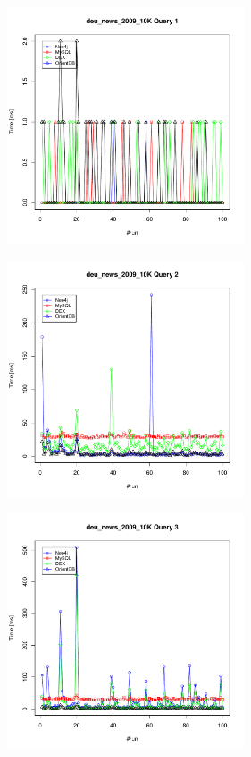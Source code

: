 \documentclass[11pt, a4paper, oneside]{article} %
\begin{document}
\begin{appendix}
\begin{landscape} 
	\newpage
	\thispagestyle{empty}
	
	\begin{figure}[ht]
		\begin{minipage}[hbt]{6.5cm}
			\centering
			\includegraphics[width=7cm]{../results/cold caches/images/10K_query1_perf}
			\label{fig:10K_query1_perf}
		\end{minipage}
		\hfill
		\begin{minipage}[hbt]{6.5cm}
			\centering
			\includegraphics[width=7cm]{../results/cold caches/images/10K_query2_perf}
			\label{fig:10K_query2_perf}
		\end{minipage}
		\hfill
		\begin{minipage}[hbt]{6.5cm}
			\centering
			\includegraphics[width=7cm]{../results/cold caches/images/10K_query3_perf}
			\label{fig:10K_query3_perf}
		\end{minipage}
		

\end{figure}
\end{landscape}
\end{appendix}
\end{document}
